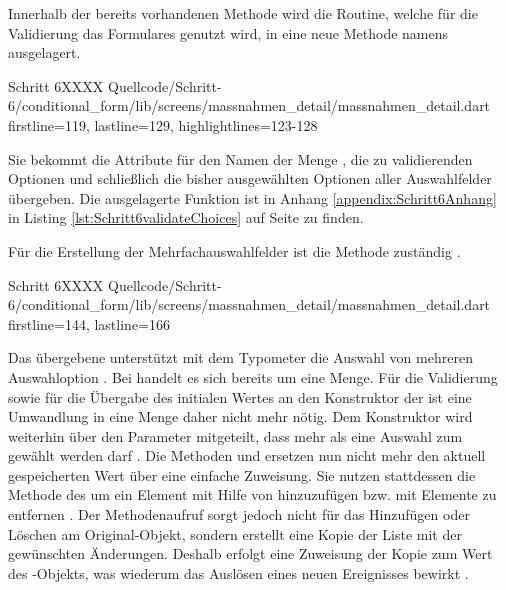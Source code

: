 Innerhalb der bereits vorhandenen Methode  wird die Routine,
welche für die Validierung das Formulares genutzt wird,
in eine neue Methode namens   ausgelagert.
\begin{alexlisting}{Schritt 6}{XXXX}
  {Quellcode/Schritt-6/conditional_form/lib/screens/massnahmen_detail/massnahmen_detail.dart}
  {firstline=119, lastline=129, highlightlines={123-128}}
  \label{lst:Schritt6buildSelectionCard}
\end{alexlisting}

Sie bekommt die Attribute für den Namen der Menge ,
die zu validierenden Optionen 
und schließlich die bisher ausgewählten Optionen aller Auswahlfelder  übergeben.
Die ausgelagerte Funktion ist in Anhang \ref{appendix:Schritt6Anhang} in Listing \ref{lst:Schritt6validateChoices} auf Seite \pageref{lst:Schritt6validateChoices} zu finden.


Für die Erstellung der Mehrfachauswahlfelder ist die Methode  zuständig \Lst{\ref{lst:Schritt6buildMultiSelectionCard}}.

\begin{alexlisting}{Schritt 6}{XXXX}
  {Quellcode/Schritt-6/conditional_form/lib/screens/massnahmen_detail/massnahmen_detail.dart}
  {firstline=144, lastline=166}
  \label{lst:Schritt6buildMultiSelectionCard}
\end{alexlisting}

Das übergebene  unterstützt mit dem Typometer  die Auswahl von mehreren Auswahloption .
Bei  handelt es sich bereits um eine Menge. Für die Validierung  sowie für die Übergabe des initialen Wertes an den Konstruktor der   ist eine Umwandlung in eine Menge daher nicht mehr nötig.
Dem Konstruktor  wird weiterhin über den Parameter  mitgeteilt, dass mehr als eine Auswahl zum gewählt werden darf .
Die Methoden  und  ersetzen nun nicht mehr den aktuell gespeicherten Wert über eine einfache Zuweisung.
Sie nutzen stattdessen die Methode  des  um ein Element mit Hilfe von  hinzuzufügen  bzw. mit  Elemente zu entfernen .
Der Methodenaufruf  sorgt jedoch nicht für das Hinzufügen oder Löschen am Original-Objekt, sondern erstellt eine Kopie der Liste mit der gewünschten Änderungen.
Deshalb erfolgt eine Zuweisung der Kopie zum Wert des -Objekts, was wiederum das Auslösen eines neuen Ereignisses bewirkt .

